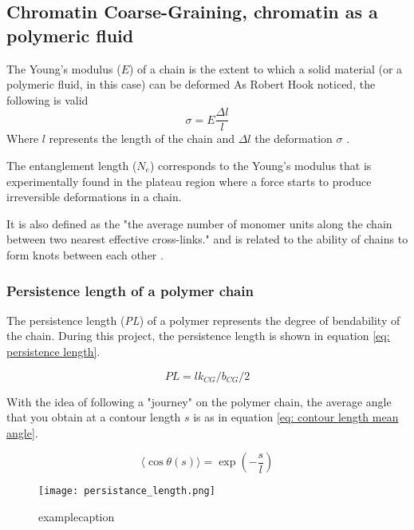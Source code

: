 
\subsection{Chromatin Coarse-Graining, chromatin as a polymeric fluid}


The Young's modulus ($E$) of a chain is the extent to which a solid material (or a polymeric fluid, in this case) can be deformed
As Robert Hook noticed, the following is valid 
\begin{equation}
    \sigma = E \frac{\Delta l}{l}
\end{equation}
Where $l$ represents the length of the chain and $\Delta l$ the deformation $\sigma$
\cite{grosbergGiantMoleculesHere2011}
.

The entanglement length ($N_e$) corresponds to the Young's modulus that is experimentally found in the plateau region where a force starts to produce irreversible deformations in a chain.



It is also defined as the "the average number of monomer units along the chain between two nearest effective cross-links."
and is related to the ability of chains to form knots between each other
\cite{grosbergGiantMoleculesHere2011}
.



\subsubsection{Persistence length of a polymer chain}

The persistence length (\textit{PL}) of a polymer represents the degree of bendability of the chain. During this project, the persistence length is shown in equation \ref{eq: persistence length}.


\begin{equation}
    PL = lk_{CG} / b_{CG} / 2
\end{equation}

With the idea of following a "journey" on the polymer chain, the average angle that you obtain at a contour length $s$ is as in equation \ref{eq: contour length mean angle}.


\begin{equation} \label{eq: contour length mean angle}
    \langle \cos{\theta(s)}\rangle = \exp{\left(-\frac{s}{l}\right)}
\end{equation}

\begin{figure}[h!] 
    \centering 
    \texttt{[image: persistance\_length.png]} 
    \caption{examplecaption} 
    \label{examplelabel} 
\end{figure}
